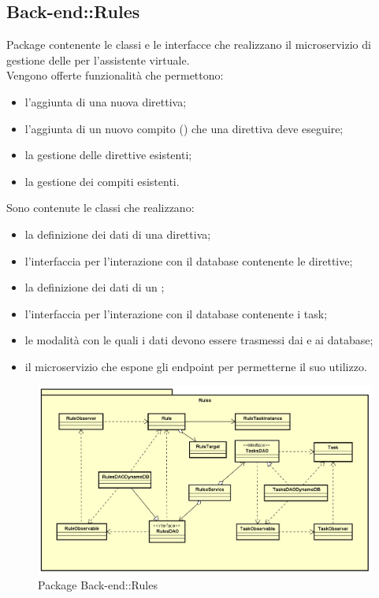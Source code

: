 \subsection{Back-end::Rules}
Package contenente le classi e le interfacce che realizzano il microservizio di gestione delle  per l'assistente virtuale.\\ Vengono offerte funzionalità che permettono: \begin{itemize} \item l'aggiunta di una nuova direttiva; \item l'aggiunta di un nuovo compito () che una direttiva deve eseguire; \item la gestione delle direttive esistenti; \item la gestione dei compiti esistenti. \end{itemize} Sono contenute le classi che realizzano: \begin{itemize} \item la definizione dei dati di una direttiva; \item l'interfaccia per l'interazione con il database contenente le direttive; \item la definizione dei dati di un ; \item l'interfaccia per l'interazione con il database contenente i task; \item le modalità con le quali i dati devono essere trasmessi dai e ai database; \item il microservizio che espone gli endpoint per permetterne il suo utilizzo. \end{itemize}
\begin{figure}[h] \centering \includegraphics[width=\textwidth,height=\textheight,keepaspectratio]{images/diagrams/back-end/Official_Backend_0304/Rules.png}
	\caption{Package Back-end::Rules}
\end{figure}
\newpage

